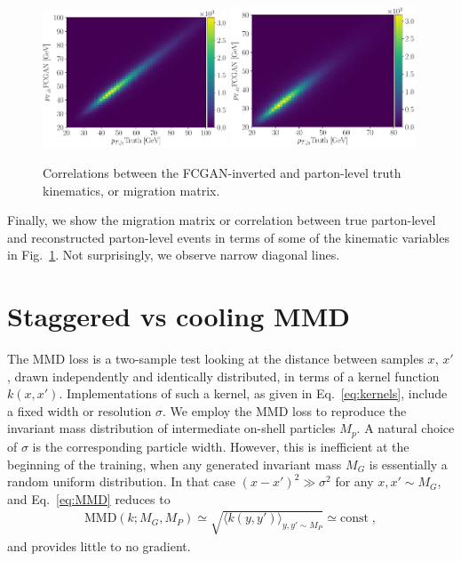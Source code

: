 \begin{appendices}
\begin{figure}[t]
\centering
\includegraphics[page = 1, width=0.49\textwidth]{figures/cGAN/cGAN_pt1_corr}
\includegraphics[page = 1, width=0.49\textwidth]{figures/cGAN/cGAN_pt2_corr}
\caption{Correlations between the FCGAN-inverted and parton-level truth
 kinematics, or migration matrix.}
\label{fig:app_2d}
\end{figure}

Finally, we show the migration matrix or correlation between true
parton-level and reconstructed parton-level events in terms of some of
the kinematic variables in Fig.~\ref{fig:app_2d}. Not surprisingly,
we observe narrow diagonal lines.

\section{Staggered vs cooling MMD}
\label{sec:app}

The MMD loss is a two-sample test looking at the distance between
samples $x$, $x'$, drawn independently and identically distributed, in
terms of a kernel function $k\left(x, x'\right)$.  Implementations of
such a kernel, as given in Eq.~\ref{eq:kernels}, include a fixed
width or resolution $\sigma$.  We employ the MMD loss to reproduce the
invariant mass distribution of intermediate on-shell particles
$M_p$. A natural choice of $\sigma$ is the corresponding particle
width. However, this is inefficient at the beginning of the training,
when any generated invariant mass $M_G$ is essentially a random
uniform distribution. In that case $\left(x - x'\right)^2 \gg
\sigma^2$ for any $x, x' \sim M_G$, and Eq.~\ref{eq:MMD} reduces to
%
\begin{align}
\text{MMD}\left(k; M_G,M_P\right) \simeq \sqrt{\langle k\left(y,y'\right)\rangle_{y,y' \sim M_P}} \simeq \text{const} \; ,
\end{align}
%
and provides little to no gradient.


\end{appendices}
